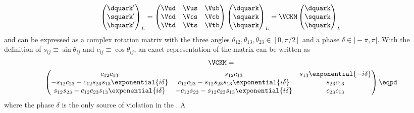 \begin{equation}
  \begin{pmatrix}
    \dquark^\prime \\
    \squark^\prime \\
    \bquark^\prime \\
  \end{pmatrix}_L
  = 
  \begin{pmatrix}
    \Vud & \Vus & \Vub \\
    \Vcd & \Vcs & \Vcb \\
    \Vtd & \Vts & \Vtb \\
  \end{pmatrix}
  \begin{pmatrix}
    \dquark \\
    \squark \\
    \bquark \\
  \end{pmatrix}_L
  = \VCKM
  \begin{pmatrix}
    \dquark \\
    \squark \\
    \bquark \\
  \end{pmatrix}_L
\end{equation}
%
and can be expressed as a complex rotation matrix with the three angles
$\theta_{12}, \theta_{13}, \theta_{23} \in {[0, \pi/2]}$ and a phase $\delta \in
{]-\pi, \pi]}$. With the definition of $s_{ij} \equiv \sin \theta_{ij}$ and
$c_{ij} \equiv \cos \theta_{ij}$, an exact representation \cite{Chau:1984fp} of
the \CKM matrix can be written as
%
\begin{multline}
  \VCKM = \\
  \begin{pmatrix}
    c_{12} c_{13}                                                   & s_{12} c_{13}                                                 & s_{13} \exponential{-i\delta} \\
    -s_{12} c_{23} - c_{12} s_{23} s_{13} \exponential{i\delta}     & c_{12} c_{23} - s_{12} s_{23} s_{13} \exponential{i\delta}    & s_{23} c_{13}                 \\
    s_{12} s_{23} - c_{12} c_{23} s_{13} \exponential{i\delta}      & -c_{12} s_{23} - s_{12} c_{23} s_{13} \exponential{i\delta}   & c_{23} c_{13}                 \\
  \end{pmatrix}\eqpd
\end{multline}
%
where the phase $\delta$ is the only source of \CP violation in the \SM. A
